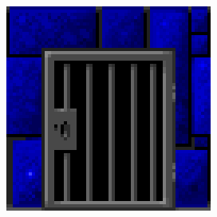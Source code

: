    \begin{minipage}{.5\textwidth} 
     \includegraphics[width=\textwidth]{screenshots/wall_texturw.png} 
   \end{minipage}

\par

